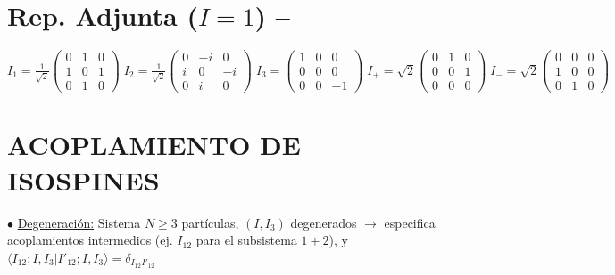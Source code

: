 \section*{Rep. Adjunta ($I=1$) -- }
$
    I_1 \!=\! \frac{1}{\sqrt{2}} \left(\begin{smallmatrix} 0 & 1 & 0 \\ 1 & 0 & 1 \\ 0 & 1 & 0 \end{smallmatrix}\right) \;
    I_2 \!=\! \frac{1}{\sqrt{2}} \left(\begin{smallmatrix} 0 & -i & 0 \\ i & 0 & -i \\ 0 & i & 0 \end{smallmatrix}\right) \;
     I_3 \!=\! \left(\begin{smallmatrix} 1 & 0 & 0 \\ 0 & 0 & 0 \\ 0 & 0 & -1 \end{smallmatrix}\right)  \;
     I_+ \!=\! \sqrt{2} \left(\begin{smallmatrix} 0 & 1 & 0 \\ 0 & 0 & 1 \\ 0 & 0 & 0 \end{smallmatrix}\right) \;
    I_- \!=\! \sqrt{2} \left(\begin{smallmatrix} 0 & 0 & 0 \\ 1 & 0 & 0 \\ 0 & 1 & 0 \end{smallmatrix}\right)
$



\section{ACOPLAMIENTO DE ISOSPINES}
$\bullet$ \underline{Degeneración:} Sistema $N\geq 3$ partículas, $(I, I_3)$ degenerados $\rightarrow$ especifica acoplamientos intermedios (ej. $I_{12}$ para el subsistema $1+2$), y $\langle I_{12}; I, I_3 | I'_{12}; I, I_3 \rangle = \delta_{I_{12} I'_{12}}$ 


